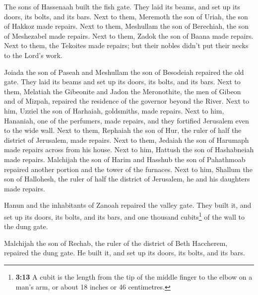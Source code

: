  The sons of Hassenaah built the fish gate. They laid its
beams, and set up its doors, its bolts, and its bars. 
Next to them, Meremoth the son of Uriah, the son of Hakkoz made repairs.
Next to them, Meshullam the son of Berechiah, the son of Meshezabel made
repairs. Next to them, Zadok the son of Baana made repairs.
 Next to them, the Tekoites made repairs; but their nobles
didn't put their necks to the Lord's work.

 Joiada the son of Paseah and Meshullam the son of
Besodeiah repaired the old gate. They laid its beams and set up its
doors, its bolts, and its bars.  Next to them, Melatiah
the Gibeonite and Jadon the Meronothite, the men of Gibeon and of
Mizpah, repaired the residence of the governor beyond the River.
 Next to him, Uzziel the son of Harhaiah, goldsmiths, made
repairs. Next to him, Hananiah, one of the perfumers, made repairs, and
they fortified Jerusalem even to the wide wall.  Next to
them, Rephaiah the son of Hur, the ruler of half the district of
Jerusalem, made repairs.  Next to them, Jedaiah the son
of Harumaph made repairs across from his house. Next to him, Hattush the
son of Hashabneiah made repairs.  Malchijah the son of
Harim and Hasshub the son of Pahathmoab repaired another portion and the
tower of the furnaces.  Next to him, Shallum the son of
Hallohesh, the ruler of half the district of Jerusalem, he and his
daughters made repairs.

 Hanun and the inhabitants of Zanoah repaired the valley
gate. They built it, and set up its doors, its bolts, and its bars, and
one thousand cubits\footnote{\textbf{3:13} A cubit is the length from
  the tip of the middle finger to the elbow on a man's arm, or about 18
  inches or 46 centimetres.} of the wall to the dung gate.

 Malchijah the son of Rechab, the ruler of the district
of Beth Haccherem, repaired the dung gate. He built it, and set up its
doors, its bolts, and its bars.

